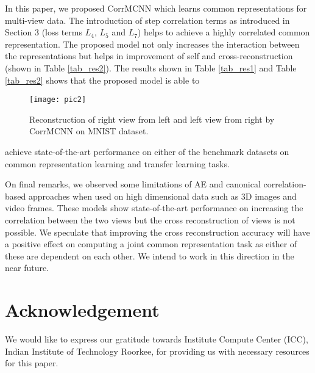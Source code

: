 \documentclass[10pt, a4paper, conference, compsocconf]{IEEEtran}
\begin{document}
In this paper, we proposed CorrMCNN which learns common representations for multi-view data. The introduction of step correlation terms as introduced in Section 3 (loss terms $L_4$, $L_5$ and $L_7$) helps to achieve a highly correlated common representation. The proposed model not only increases the interaction between the representations but helps in improvement of self and cross-reconstruction (shown in Table \ref{tab_res2}). The results shown in Table \ref{tab_res1} and Table \ref{tab_res2} shows that the proposed model is able to 
\begin{figure}
\centering\texttt{[image: pic2]}
\caption{Reconstruction of right view from left and left view from right by CorrMCNN on MNIST dataset.}
\label{fig:two}
\end{figure}
achieve state-of-the-art performance on either of the benchmark datasets on common representation learning and transfer learning tasks. 

On final remarks, we observed some limitations of AE and canonical correlation-based approaches when used on high dimensional data such as 3D images and video frames. These models show state-of-the-art performance on increasing the correlation between the two views but the cross reconstruction of views is not possible. We speculate that improving the cross reconstruction accuracy will have a positive effect on computing a joint common representation task as either of these are dependent on each other. We intend to work in this direction in the near future. 

\section*{Acknowledgement}
We would like to express our gratitude towards Institute Compute Center (ICC), Indian Institute of Technology Roorkee, for providing us with necessary resources for this paper.





%






%
%
%
\end{document}
